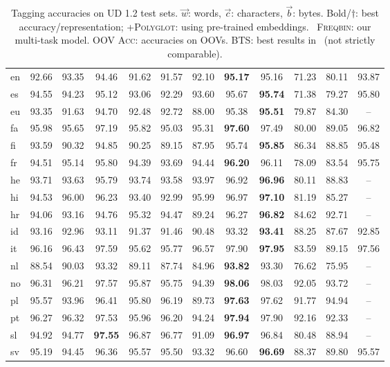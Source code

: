 \documentclass[11pt]{article}
\begin{document}
\begin{table*}[h!t]
{\begin{tabular}{lcc|cccc|cc|cc|c}
en	& 92.66 & 93.35 & 94.46 & 91.62 & 91.57 & 92.10 & \textbf{95.17} & 95.16 & 71.23& 80.11 & 93.87\\
es	& 94.55 & 94.23 & 95.12 & 93.06 & 92.29 & 93.60 & 95.67 & \textbf{95.74} & 71.38 & 79.27 & 95.80\\
eu	& 93.35 & 91.63 &  94.70 & 92.48 & 92.72 & 88.00 & 95.38 & \textbf{95.51}& 79.87 & 84.30 & --\\
fa	& 95.98 & 95.65 &  97.19 & 95.82	 & 95.03 & 95.31 & \textbf{97.60} & 97.49& 80.00& 89.05  & 96.82\\
fi	& 93.59 & 90.32 &  94.85 & 90.25	 & 89.15 & 87.95 & 95.74 & \textbf{95.85}& 86.34 & 88.85 & 95.48\\
fr	& 94.51 & 95.14 &  95.80 & 94.39	 & 93.69 & 94.44 & \textbf{96.20} & 96.11& 78.09 &  83.54 & 95.75\\
he	& 93.71 & 93.63 &  95.79 & 93.74	 & 93.58 & 93.97 & 96.92 & \textbf{96.96}& 80.11 & 88.83 & --\\
hi	& 94.53 & 96.00 &  96.23 & 93.40 & 92.99 & 95.99 & 96.97 & \textbf{97.10}& 81.19& 85.27 & --\\
hr	& 94.06 & 93.16 &  94.76 &95.32 & 94.47 & 89.24 & 96.27 & \textbf{96.82}& 84.62& 92.71 & --\\
id	& 93.16 & 92.96 &  93.11 & 91.37 & 91.46 & 90.48 & 93.32 & \textbf{93.41}& 88.25 & 87.67 & 92.85\\
it	& 96.16 & 96.43 &  97.59 & 95.62 & 95.77 & 96.57 & 97.90 & \textbf{97.95}& 83.59 & 89.15 & 97.56\\
nl	& 88.54 & 90.03 &  93.32 & 89.11 & 87.74 & 84.96 & \textbf{93.82} & 93.30& 76.62 & 75.95 & --\\
no	& 96.31 & 96.21 &  97.57 & 95.87	 & 95.75 & 94.39 & \textbf{98.06} & 98.03& 92.05 & 93.72  & --\\
pl	& 95.57 & 93.96 &  96.41 & 95.80 & 96.19 & 89.73 & \textbf{97.63} & 97.62& 91.77 & 94.94 & --\\
pt	& 96.27 & 96.32 &  97.53 & 95.96	& 96.20 & 94.24 & \textbf{97.94} & 97.90& 92.16 & 92.33 & --\\
sl	& 94.92 & 94.77 &  \textbf{97.55} & 96.87	 & 96.77 & 91.09 & \textbf{96.97} & 96.84& 80.48& 88.94 & --\\
sv	& 95.19 & 94.45 &  96.36 & 95.57 & 95.50 &93.32 & 96.60 & \textbf{96.69}& 88.37 & 89.80 & 95.57\\
\bottomrule

\end{tabular}
}
\caption{Tagging accuracies on UD 1.2 test sets. $\vec{w}$: words, $\vec{c}$: characters, $\vec{b}$: bytes. 
Bold/$\dagger$: best accuracy/representation; \textsc{+Polyglot}: using pre-trained embeddings. \
\textsc{Freqbin}: our multi-task model. \textsc{OOV Acc}: accuracies on OOVs. 
BTS: best results in~\newcite{gillick:ea:2016} (not strictly comparable). }
\label{tbl:results}
\end{table*}
\end{document}

